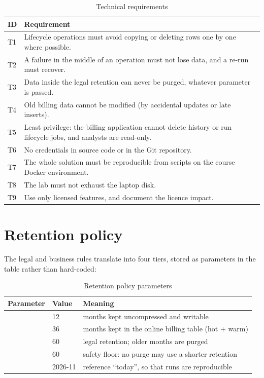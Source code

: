 \begin{table}[H]
\centering
\caption{Technical requirements}
\begin{tabularx}{\linewidth}{lL}
\toprule
ID & Requirement \\
\midrule
T1 & Lifecycle operations must avoid copying or deleting rows one by one where possible. \\
T2 & A failure in the middle of an operation must not lose data, and a re-run must recover. \\
T3 & Data inside the legal retention can never be purged, whatever parameter is passed. \\
T4 & Old billing data cannot be modified (by accidental updates or late inserts). \\
T5 & Least privilege: the billing application cannot delete history or run lifecycle jobs, and analysts are read-only. \\
T6 & No credentials in source code or in the Git repository. \\
T7 & The whole solution must be reproducible from scripts on the course Docker environment. \\
T8 & The lab must not exhaust the laptop disk. \\
T9 & Use only licensed features, and document the licence impact. \\
\bottomrule
\end{tabularx}
\end{table}

\section{Retention policy}

The legal and business rules translate into four tiers, stored as parameters in the
 table rather than hard-coded:

\begin{table}[H]
\centering
\caption{Retention policy parameters}
\begin{tabularx}{\linewidth}{llL}
\toprule
Parameter & Value & Meaning \\
\midrule
{} & 12 & months kept uncompressed and writable \\
 & 36 & months kept in the online billing table (hot + warm) \\
 & 60 & legal retention; older months are purged \\
 & 60 & safety floor: no purge may use a shorter retention \\
 & 2026-11 & reference ``today'', so that runs are reproducible \\
\bottomrule
\end{tabularx}
\end{table}

